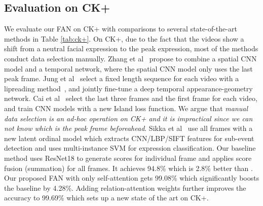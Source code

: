 \documentclass{article}
\begin{document}
\subsection{Evaluation on CK+}
We evaluate our FAN on CK+ with comparisons to several state-of-the-art methods in Table \ref{tab:ck+}. 
On CK+, due to the fact that the videos show a shift from a neutral facial expression to the peak expression, most of the methods conduct data selection manually. Zhang et al~\cite{zhang2017facial} propose to combine a spatial CNN model and a temporal network, where the spatial CNN model only uses the last peak frame. Jung et al~\cite{Jung2015Joint} select a fixed length sequence for each video with a lipreading method~\cite{ZihengZhou:2011}, and jointly fine-tune a deep temporal appearance-geometry network. Cai et al~\cite{cai2018island} select the last three frames and the first frame for each video, and train CNN models with a new Island loss function.
We argue that\textit{ manual data selection is an ad-hoc operation on CK+ and it is impractical since we can not know which is the peak frame beforeahead}. Sikka et al~\cite{sikka2016lomo} use all frames with a new latent ordinal model which extracts CNN/LBP/SIFT features for sub-event detection and uses multi-instance SVM for expression classification.
Our baseline method uses ResNet18 to generate scores for individual frame and applies score fusion (summation) for all frames. It achieves 94.8\% which is 2.8\% better than \cite{sikka2016lomo}. Our proposed FAN with only self-attention gets 99.08\% which significantly boosts the baseline by 4.28\%. Adding relation-attention weights further improves the accuracy to 99.69\% which sets up a new state of the art on CK+.
\end{document}
